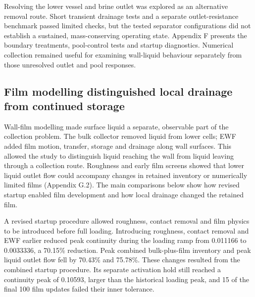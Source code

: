 Resolving the lower vessel and brine outlet was explored as an alternative removal route. Short transient drainage tests and a separate outlet-resistance benchmark passed limited checks, but the tested separator configurations did not establish a sustained, mass-conserving operating state. Appendix F presents the boundary treatments, pool-control tests and startup diagnostics. Numerical collection remained useful for examining wall-liquid behaviour separately from those unresolved outlet and pool responses.

\subsection{Film modelling distinguished local drainage from continued storage}

Wall-film modelling made surface liquid a separate, observable part of the collection problem. The bulk collector removed liquid from lower cells; EWF added film motion, transfer, storage and drainage along wall surfaces. This allowed the study to distinguish liquid reaching the wall from liquid leaving through a collection route. Roughness and early film screens showed that lower liquid outlet flow could accompany changes in retained inventory or numerically limited films (Appendix G.2). The main comparisons below show how revised startup enabled film development and how local drainage changed the retained film.

A revised startup procedure allowed roughness, contact removal and film physics to be introduced before full loading. Introducing roughness, contact removal and EWF earlier reduced peak continuity during the loading ramp from 0.011166 to 0.0033336, a 70.15\% reduction. Peak combined bulk-plus-film inventory and peak liquid outlet flow fell by 70.43\% and 75.78\%. These changes resulted from the combined startup procedure. Its separate activation hold still reached a continuity peak of 0.10593, larger than the historical loading peak, and 15 of the final 100 film updates failed their inner tolerance.

